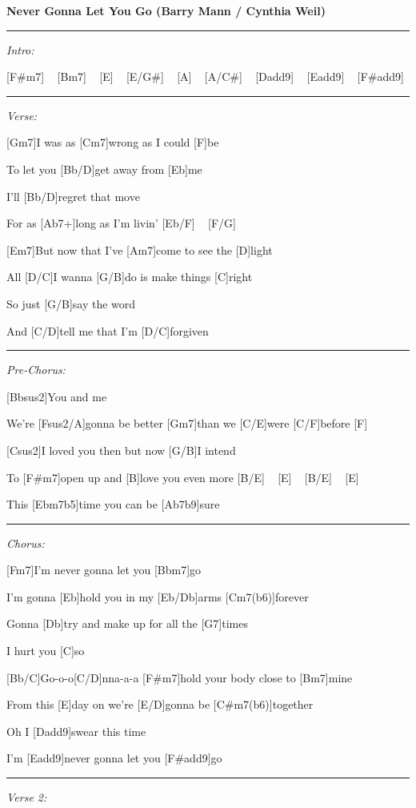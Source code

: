 \documentclass{article}
\begin{document}
\begin{guitar}
\textbf{Never Gonna Let You Go (Barry Mann / Cynthia Weil)}

\hrule

\emph{Intro:}

[F#m7] ~ [Bm7] ~ [E] ~ [E/G#] ~ [A] ~ [A/C#] ~ [Dadd9] ~ [Eadd9] ~ [F#add9]

\hrule

\emph{Verse:}

[Gm7]I was as [Cm7]wrong as I could [F]be

To let you [Bb/D]get away from [Eb]me

I'll [Bb/D]regret that move

For as [Ab7+]long as I'm livin' [Eb/F] ~ [F/G] ~



[Em7]But now that I've [Am7]come to see the [D]light

All [D/C]I wanna [G/B]do is make things [C]right

So just [G/B]say the word

And [C/D]tell me that I'm [D/C]forgiven

\hrule

\emph{Pre-Chorus:}

[Bbsus2]You and me

We're [Fsus2/A]gonna be better [Gm7]than we [C/E]were [C/F]before [F] ~

[Csus2]I loved you then but now [G/B]I intend

To [F#m7]open up and [B]love you even more [B/E] ~ [E] ~ [B/E] ~ [E] ~

This [Ebm7b5]time you can be [Ab7b9]sure

\pagebreak
\hrule

\emph{Chorus:}

[Fm7]I'm never gonna let you [Bbm7]go

I'm gonna [Eb]hold you in my [Eb/Db]arms [Cm7(b6)]forever

Gonna [Db]try and make up for all the [G7]times

I hurt you [C]so

[Bb/C]Go-o-o[C/D]nna-a-a [F#m7]hold your body close to [Bm7]mine

From this [E]day on we're [E/D]gonna be [C#m7(b6)]together

Oh I [Dadd9]swear this time

I'm [Eadd9]never gonna let you [F#add9]go

\hrule

\emph{Verse 2:}


\end{guitar}
\end{document}
